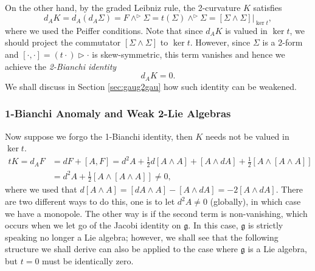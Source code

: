 \documentclass[onecolumn]{article}
\theoremstyle{theorem}
\theoremstyle{remark}
\theoremstyle{example}
\theoremstyle{definition}
\numberwithin{equation}{section}
\def\ker{\operatorname{ker}}
\def\g{\mathfrak g}
\newcommand{\flo}[1]{{\color{red}{#1}}}
\begin{document}
On the other hand,  by the graded Leibniz rule, the 2-curvature $K$ satisfies 
\begin{equation}
    d_A K = d_A(d_A\Sigma)=%
    F\wedge^\rhd \Sigma= t(\Sigma)\wedge^\rhd \Sigma = [\Sigma\wedge \Sigma]|_{\operatorname{ker}t},\nonumber
\end{equation}
where we used the Peiffer conditions. Note that since $ d_A K$ is valued in $\ker t$, we should project the commutator $[\Sigma\wedge \Sigma]$ to $\ker t$. However, since $\Sigma$ is a 2-form and $[\cdot,\cdot] = (t\cdot )\rhd \cdot$ is skew-symmetric, %
this term vanishes and hence we achieve the  {\it {2-Bianchi identity}}
\begin{equation}
    d_AK =0.\label{2-bianch}
\end{equation}
{We} shall discuss in Section \ref{sec:gaug2gau} how such identity can be weakened.







\subsubsection{1-Bianchi Anomaly and Weak 2-Lie Algebras}\label{weak}
Now suppose we forgo the 1-Bianchi identity, then  $K$ needs not be valued in $\operatorname{ker}t$. 
\begin{align}
  tK =  d_AF &= dF + [A,F] = d^2A+\frac{1}{2}d[A\wedge A] + [A\wedge dA] + \frac{1}{2}[A\wedge [A\wedge A]] 
  \nonumber\\ &= d^2A+\frac{1}{2}[A\wedge [A\wedge A]]\neq 0, \nonumber  
\end{align}
where we used that $d[A\wedge A] = [dA\wedge A] - [A\wedge dA] = -2[A\wedge dA]$.  There are two different ways to do this, one is to let $d^2A\neq0$ (globally), in which case we have a monopole. The other way is if the second term is non-vanishing, which occurs when we let go of the Jacobi identity on $\g$. In this case, $\g$ is strictly speaking no longer a Lie algebra; however, we shall see that the following structure we shall derive can also be applied to the case where $\g$ is a Lie algebra, but $t=0$ must be identically zero. 
\end{document}
